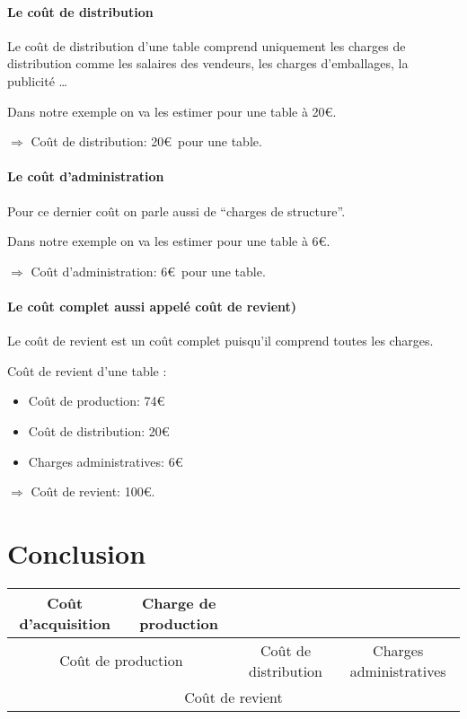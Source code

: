 \documentclass[12pt,a4paper,openany]{report}
\begin{document}
		\paragraph{Le coût de distribution}
		Le coût de distribution d'une table comprend uniquement les charges de distribution comme les salaires
		des vendeurs, les charges d'emballages, la publicité \ldots

		Dans notre exemple on va les estimer pour une table à 20\euro .
	\begin{center}$\Rightarrow$ Coût de distribution: 20\euro~pour une table.\end{center}
		\paragraph{Le coût d'administration}
		Pour ce dernier coût on parle aussi de ``charges de structure''. 

		Dans notre exemple on va les estimer pour une table à 6\euro .
	\begin{center}$\Rightarrow$ Coût d'administration: 6\euro~pour une table.\end{center}
		\paragraph{Le coût complet aussi appelé coût de revient)}
		Le coût de revient est un coût complet puisqu'il comprend toutes les charges.

		Coût de revient d'une table : 
		\begin{itemize}
			\item Coût de production: 74\euro
			\item Coût de distribution: 20\euro 
			\item Charges administratives: 6\euro
		\end{itemize}
	\begin{center}$\Rightarrow$ Coût de revient: 100\euro.\end{center}
	\section{Conclusion}
	\begin{tabular}{|c|c|c|c|}
		\hline
		Coût d'acquisition & Charge de production &\multicolumn{2}{c|}{}\\
		\hline
		\multicolumn{2}{|c|}{Coût de production} & Coût de distribution & Charges administratives\\
		\hline
		\multicolumn{4}{|c|}{Coût de revient}\\
		\hline
	\end{tabular}
\end{document}
